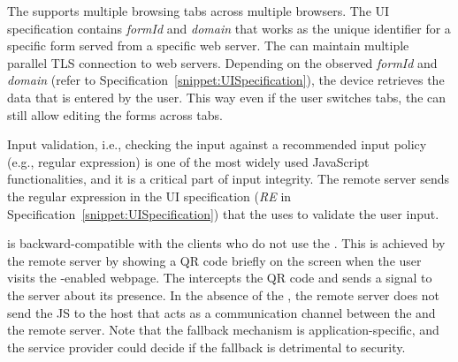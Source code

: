 The \device supports multiple browsing tabs across multiple browsers. The UI specification contains \emph{formId} and \emph{domain} that works as the unique identifier for a specific form served from a specific web server. The \device can maintain multiple parallel TLS connection to web servers. Depending on the observed \emph{formId} and \emph{domain} (refer to Specification~\ref{snippet:UISpecification}), the device retrieves the data that is entered by the user. This way even if the user switches tabs, the \device can still allow editing the forms across tabs.


 Input validation, i.e., checking the input against a recommended input policy (e.g., regular expression) is one of the most widely used JavaScript functionalities, and it is a critical part of input integrity. The remote server sends the regular expression in the UI specification (\emph{RE} in Specification~\ref{snippet:UISpecification}) that the \device uses to validate the user input.



 \name is backward-compatible with the clients who do not use the \device. This is achieved by the remote server by showing a QR code briefly on the screen when the user visits the \name-enabled webpage. The \device intercepts the QR code and sends a signal to the server about its presence. In the absence of the \device, the remote server does not send the \name JS to the host that acts as a communication channel between the \device and the remote server. Note that the fallback mechanism is application-specific, and the service provider could decide if the fallback is detrimental to security.

